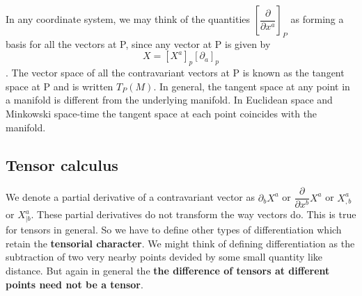 \documentclass[12pt,a4paper]{article}
\numberwithin{table}{section}
\numberwithin{figure}{section}
\numberwithin{equation}{section}
\theoremstyle{remark}
\theoremstyle{definition}
\begin{document}
In any coordinate system, we may think of the quantities $\left[\dfrac{\partial}{\partial x^a}\right]_P$ as 
forming a basis for all the vectors at P, since any vector at P is given by $$X=[X^a]_p[\partial_a]_p $$. The vector space of all the 
contravariant vectors at P is known as the tangent space at P and is written 
$T_P(M)$. In general, the tangent space at any point in a manifold is different from the underlying manifold. In Euclidean space and Minkowski space-time the tangent space at each point coincides with the manifold.

\subsection{Tensor calculus}
We denote a partial derivative of a contravariant vector as $\partial_bX^a$ or  $\dfrac{\partial}{\partial x^b}X^a$ or $X^a_{ ,b}$ or $X^a_{ |b}$. These partial derivatives do not transform the way vectors do. This is true for tensors in general. So we have to define other types of differentiation  which retain the \textbf{tensorial character}. We might think of defining differentiation as the subtraction of two very nearby points devided by some small quantity like distance. But again in general the \textbf{the difference of tensors at different points need not be a tensor}.
\end{document}
